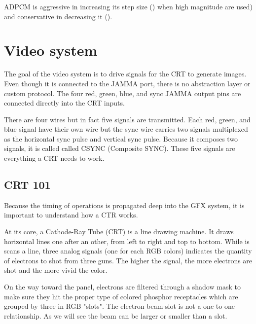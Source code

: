 


ADPCM is aggressive in increasing its step size () when high magnitude are used) and conservative in decreasing it ().









\section{Video system}
The goal of the video system is to drive signals for the CRT to generate images. Even though it is connected to the JAMMA port, there is no abstraction layer or custom protocol. The four red, green, blue, and sync JAMMA output pins are connected directly into the CRT inputs.


There are four wires but in fact five signals are transmitted. Each red, green, and blue signal have their own wire but the sync wire carries two signals multiplexed as the horizontal sync pulse and vertical sync pulse. Because it composes two signals, it is called called CSYNC (Composite SYNC). These five signals are everything a CRT needs to work. 

\subsection{CRT 101}

Because the timing of operations is propagated deep into the GFX system, it is important to understand how a CTR works.

At its core, a Cathode-Ray Tube (CRT) is a line drawing machine. It draws horizontal lines one after an other, from left to right and top to bottom. While is scans a line, three analog signals (one for each RGB colors) indicates the quantity of electrons to shot from three guns. The higher the signal, the more electrons are shot and the more vivid the color.


On the way toward the panel, electrons are filtered through a shadow mask to make sure they hit the proper type of colored phosphor receptacles which are grouped by three in RGB "slots". The electron beam-slot is not a one to one relationship. As we will see the beam can be larger or smaller than a slot.


